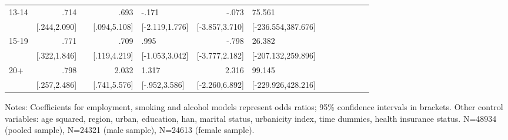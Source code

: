 \begin{table}[h]
\begin{adjustbox}{max width=\linewidth}
\begin{threeparttable}
{\begin{tabular}{l*{6}{D{.}{.}{-1}l}}
13-14           &            .714&                &            .693&           -.171&           -.073&          75.561\\
                &    [.244,2.090]&                &    [.094,5.108]&  [-2.119,1.776]&  [-3.857,3.710]&[-236.554,387.676]\\

15-19           &            .771&                &            .709&            .995&           -.798&          26.382\\
                &    [.322,1.846]&                &    [.119,4.219]&  [-1.053,3.042]&  [-3.777,2.182]&[-207.132,259.896]\\

20+             &            .798&                &           2.032&           1.317&           2.316&          99.145\\
                &    [.257,2.486]&                &    [.741,5.576]&   [-.952,3.586]&  [-2.260,6.892]&[-229.926,428.216]\\         
\bottomrule
\end{tabular}
\begin{tablenotes}
\item Notes: Coefficients for employment, smoking and alcohol models represent odds ratios;  95\% confidence intervals in brackets.
Other control variables: age squared, region, urban, education, han, marital status, urbanicity index, time dummies, health insurance status. N=48934 (pooled sample), N=24321 (male sample), N=24613 (female sample).
\end{tablenotes}
}
\end{threeparttable}
\end{adjustbox}
\end{table}
\FloatBarrier

